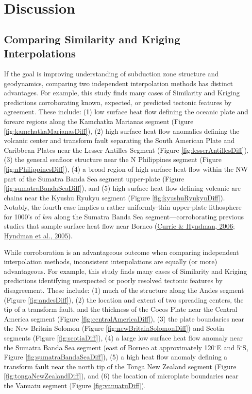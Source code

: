 \hypertarget{chpt3Discussion}{%
\section{Discussion}\label{chpt3Discussion}}

\hypertarget{interpDiffDiscussion}{%
\subsection{Comparing Similarity and Kriging Interpolations}\label{interpDiffDiscussion}}

If the goal is improving understanding of subduction zone structure and geodynamics, comparing two independent interpolation methods has distinct advantages. For example, this study finds many cases of Similarity and Kriging predictions corroborating known, expected, or predicted tectonic features by agreement. These include: (1) low surface heat flow defining the oceanic plate and forearc regions along the Kamchatka Marianas segment (Figure \ref{fig:kamchatkaMarianasDiff}), (2) high surface heat flow anomalies defining the volcanic center and transform fault separating the South American Plate and Caribbean Plates near the Lesser Antilles Segment (Figure \ref{fig:lesserAntillesDiff}), (3) the general seafloor structure near the N Philippines segment (Figure \ref{fig:nPhilippinesDiff}), (4) a broad region of high surface heat flow within the NW part of the Sumatra Banda Sea segment upper-plate (Figure \ref{fig:sumatraBandaSeaDiff}), and (5) high surface heat flow defining volcanic arc chains near the Kyushu Ryukyu segment (Figure \ref{fig:kyushuRyukyuDiff}). Notably, the fourth case implies a rather uniformly-thin upper-plate lithosphere for 1000's of \(km\) along the Sumatra Banda Sea segment---corroborating previous studies that sample surface heat flow near Borneo (\protect\hyperlink{ref-currie2006}{Currie \& Hyndman, 2006}; \protect\hyperlink{ref-hyndman2005}{Hyndman et al., 2005}).

While corroboration is an advantageous outcome when comparing independent interpolation methods, inconsistent interpolations are equally (or more) advantageous. For example, this study finds many cases of Similarity and Kriging predictions identifying unexpected or poorly resolved tectonic features by disagreement. These include: (1) much of the structure along the Andes segment (Figure \ref{fig:andesDiff}), (2) the location and extent of two spreading centers, the tip of a transform fault, and the thickness of the Cocos Plate near the Central America segment (Figure \ref{fig:centralAmericaDiff}), (3) the plate boundaries near the New Britain Solomon (Figure \ref{fig:newBritainSolomonDiff}) and Scotia segments (Figure \ref{fig:scotiaDiff}), (4) a large low surface heat flow anomaly near the Sumatra Banda Sea segment (east of Borneo at approximately 120\(^\circ\)E and 5\(^\circ\)S, Figure \ref{fig:sumatraBandaSeaDiff}), (5) a high heat flow anomaly defining a transform fault near the north tip of the Tonga New Zealand segment (Figure \ref{fig:tongaNewZealandDiff}), and (6) the location of microplate boundaries near the Vanuatu segment (Figure \ref{fig:vanuatuDiff}).

